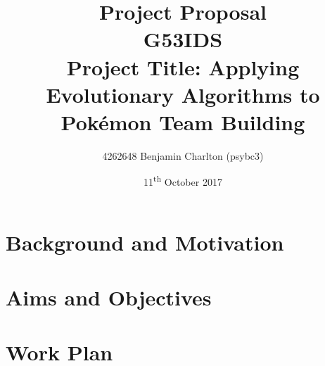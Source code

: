 \documentclass{article}
\newcommand{\Pokemon}{Pok\'{e}mon}
\begin{document}
\title{
    Project Proposal
    \\ \large{G53IDS}
    \\ \large{Project Title: Applying Evolutionary Algorithms to \Pokemon{} Team Building}\vspace{-3ex}}
\author{4262648 Benjamin Charlton (psybc3)}
\date{\vspace{-2ex}11\textsuperscript{th} October 2017}
\maketitle

\section{Background and Motivation}
\lipsum[1]

\section{Aims and Objectives}
\lipsum[1]

\section{Work Plan}
\lipsum[1]

\nocite{bar}


\end{document}
